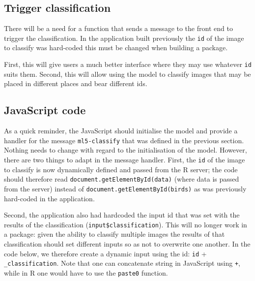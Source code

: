 \documentclass[10pt,]{krantz}
\makeatletter
\newenvironment{Shaded}{\begin{snugshade}}{\end{snugshade}}
\newcommand{\CommentTok}[1]{\textcolor[rgb]{0.37,0.37,0.37}{\textit{#1}}}
\newcommand{\ControlFlowTok}[1]{\textcolor[rgb]{0.27,0.27,0.27}{\textbf{#1}}}
\newcommand{\DataTypeTok}[1]{\textcolor[rgb]{0.27,0.27,0.27}{#1}}
\newcommand{\KeywordTok}[1]{\textcolor[rgb]{0.27,0.27,0.27}{\textbf{#1}}}
\newcommand{\NormalTok}[1]{#1}
\newcommand{\OperatorTok}[1]{\textcolor[rgb]{0.43,0.43,0.43}{\textbf{#1}}}
\newcommand{\StringTok}[1]{\textcolor[rgb]{0.5,0.5,0.5}{#1}}
\newenvironment{kframe}{%
\medskip{}
\setlength{\fboxsep}{.8em}
 \def\at@end@of@kframe{}%
 \ifinner\ifhmode%
  \def\at@end@of@kframe{\end{minipage}}%
  \begin{minipage}{\columnwidth}%
 \fi\fi%
 \def\FrameCommand##1{\hskip\@totalleftmargin \hskip-\fboxsep
 \colorbox{shadecolor}{##1}\hskip-\fboxsep
     \hskip-\linewidth \hskip-\@totalleftmargin \hskip\columnwidth}%
 \MakeFramed {\advance\hsize-\width
   \@totalleftmargin\z@ \linewidth\hsize
   \@setminipage}}%
 {\par\unskip\endMakeFramed%
 \at@end@of@kframe}
\renewenvironment{Shaded}{\begin{kframe}}{\end{kframe}}
\makeatother
\begin{document}
\hypertarget{shiny-complete-pkg-trigger}{%
\subsection{Trigger classification}\label{shiny-complete-pkg-trigger}}

There will be a need for a function that sends a message to the front end to trigger the classification. In the application built previously the \texttt{id} of the image to classify was hard-coded this must be changed when building a package.

First, this will give users a much better interface where they may use whatever \texttt{id} suits them. Second, this will allow using the model to classify images that may be placed in different places and bear different ids.

\begin{Shaded}
\end{Shaded}

\hypertarget{shiny-complete-pkg-js-code}{%
\subsection{JavaScript code}\label{shiny-complete-pkg-js-code}}

As a quick reminder, the JavaScript should initialise the model and provide a handler for the message \texttt{ml5-classify} that was defined in the previous section. Nothing needs to change with regard to the initialisation of the model. However, there are two things to adapt in the message handler. First, the \texttt{id} of the image to classify is now dynamically defined and passed from the R server; the code should therefore read \texttt{document.getElementById(data)} (where data is passed from the server) instead of \texttt{document.getElementById(\textquotesingle{}birds\textquotesingle{})} as was previously hard-coded in the application.

Second, the application also had hardcoded the input id that was set with the results of the classification (\texttt{input\$classification}). This will no longer work in a package: given the ability to classify multiple images the results of that classification should set different inputs so as not to overwrite one another. In the code below, we therefore create a dynamic input using the id: \texttt{id} + \texttt{\_classification}. Note that one can concatenate string in JavaScript using \texttt{+}, while in R one would have to use the \texttt{paste0} function.
\end{document}
